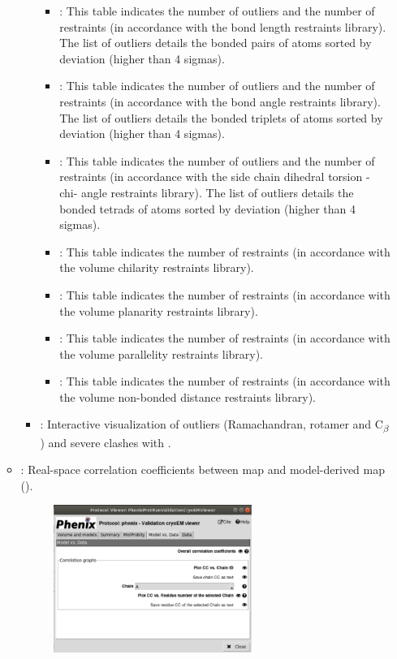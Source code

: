 \begin{itemize}
\begin{itemize}
\begin{itemize}
            \begin{itemize}
             \item {}: This table indicates the number of outliers and the number of restraints (in accordance with the bond length restraints library). The list of outliers details the bonded pairs of atoms sorted by deviation (higher than 4 sigmas).
             \item {}: This table indicates the number of outliers and the number of restraints (in accordance with the bond angle restraints library). The list of outliers details the bonded triplets of atoms sorted by deviation (higher than 4 sigmas). 
             \item {}: This table indicates the number of outliers and the number of restraints (in accordance with the side chain dihedral torsion - chi- angle restraints library). The list of outliers details the bonded tetrads of atoms sorted by deviation (higher than 4 sigmas).
             \item {}: This table indicates the number of restraints (in accordance with the volume chilarity restraints library).
             \item {}: This table indicates the number of restraints (in accordance with the volume planarity restraints library).
             \item {}: This table indicates the number of restraints (in accordance with the volume parallelity restraints library).
             \item {}: This table indicates the number of restraints (in accordance with the volume non-bonded distance restraints library).
            \end{itemize}
         \item {}: Interactive visualization of outliers (Ramachandran, rotamer and C\textsubscript{$\beta$}\xspace) and severe clashes with \coot.
        \end{itemize}
      \item {}: Real-space correlation coefficients between map and model-derived map ().
       \begin{figure}[H]
         \centering 
         \captionsetup{width=.7\linewidth} 
         \includegraphics[width=0.65\textwidth]{Images_appendix/Fig203.pdf}

\end{figure}
\end{itemize}
\end{itemize}
